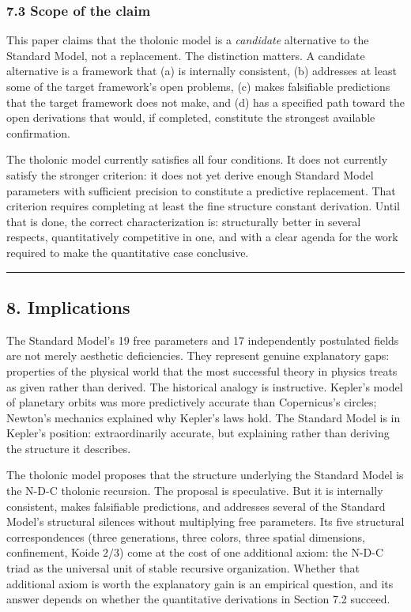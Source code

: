 \documentclass[
  11pt,
  letterpaper,
]{article}
\begin{document}
\subsubsection{7.3 Scope of the claim}\label{scope-of-the-claim}

This paper claims that the tholonic model is a \emph{candidate}
alternative to the Standard Model, not a replacement. The distinction
matters. A candidate alternative is a framework that (a) is internally
consistent, (b) addresses at least some of the target framework's open
problems, (c) makes falsifiable predictions that the target framework
does not make, and (d) has a specified path toward the open derivations
that would, if completed, constitute the strongest available
confirmation.

The tholonic model currently satisfies all four conditions. It does not
currently satisfy the stronger criterion: it does not yet derive enough
Standard Model parameters with sufficient precision to constitute a
predictive replacement. That criterion requires completing at least the
fine structure constant derivation. Until that is done, the correct
characterization is: structurally better in several respects,
quantitatively competitive in one, and with a clear agenda for the work
required to make the quantitative case conclusive.

\begin{center}\rule{0.5\linewidth}{0.5pt}\end{center}

\subsection{8. Implications}\label{implications}

The Standard Model's 19 free parameters and 17 independently postulated
fields are not merely aesthetic deficiencies. They represent genuine
explanatory gaps: properties of the physical world that the most
successful theory in physics treats as given rather than derived. The
historical analogy is instructive. Kepler's model of planetary orbits
was more predictively accurate than Copernicus's circles; Newton's
mechanics explained why Kepler's laws hold. The Standard Model is in
Kepler's position: extraordinarily accurate, but explaining rather than
deriving the structure it describes.

The tholonic model proposes that the structure underlying the Standard
Model is the N-D-C tholonic recursion. The proposal is speculative. But
it is internally consistent, makes falsifiable predictions, and
addresses several of the Standard Model's structural silences without
multiplying free parameters. Its five structural correspondences (three
generations, three colors, three spatial dimensions, confinement, Koide
\(2/3\)) come at the cost of one additional axiom: the N-D-C triad as
the universal unit of stable recursive organization. Whether that
additional axiom is worth the explanatory gain is an empirical question,
and its answer depends on whether the quantitative derivations in
Section 7.2 succeed.
\end{document}
